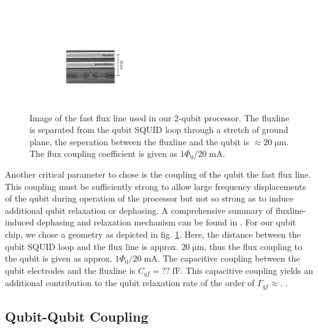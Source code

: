 \begin{figure}
\centering
	\includegraphics[width=6cm]{"./material/figures/2-qubit-processor/fluxline design"}
	\caption[]{Image of the fast flux line used in our 2-qubit processor. The fluxline is separated from the qubit SQUID loop through a stretch of ground plane, the seperation between the fluxline and the qubit is $\approx 20\;\mathrm{\mu m}$. The flux coupling coefficient is given as $1\Phi_0/20\;\mathrm{mA}$.}
	\label{fig:fluxline_design}
\end{figure}

Another critical parameter to chose is the coupling of the qubit the fast flux line. This coupling must be sufficiently strong to allow large frequency displacements of the qubit during operation of the processor but not so strong as to induce additional qubit relaxation or dephasing. A comprehensive summary of fluxline-induced dephasing and relaxation mechanism can be found in \cite{koch_charge-insensitive_2007}. For our qubit chip, we chose a geometry as depicted in fig. \ref{fig:fluxline_design}. Here, the distance between the qubit SQUID loop and the flux line is approx. $20\;\mathrm{\mu m}$, thus the flux coupling to the qubit is given as approx. $1 \Phi_0 / 20\;\mathrm{mA}$. The capacitive coupling between the qubit electrodes and the fluxline is $C_{qf}=??\;\mathrm{fF}$. This capacitive coupling yields an additional contribution to the qubit relaxation rate of the order of $\Gamma_{qf}\approx$. .

\subsection{Qubit-Qubit Coupling}

